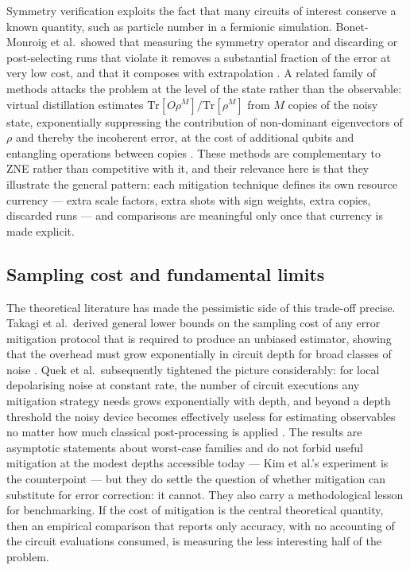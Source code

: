 \documentclass[Thesis.tex]{subfiles}
\begin{document}
Symmetry verification exploits the fact that many circuits of interest conserve
a known quantity, such as particle number in a fermionic simulation.
Bonet-Monroig et al.\ showed that measuring the symmetry operator and
discarding or post-selecting runs that violate it removes a substantial
fraction of the error at very low cost, and that it composes with
extrapolation \cite{bonetmonroig2018symmetry}. A related family of methods
attacks the problem at the level of the state rather than the observable:
virtual distillation estimates
$\mathrm{Tr}[O\rho^{M}]/\mathrm{Tr}[\rho^{M}]$ from $M$ copies of the noisy
state, exponentially suppressing the contribution of non-dominant eigenvectors
of $\rho$ and thereby the incoherent error, at the cost of additional qubits
and entangling operations between copies \cite{huggins2021virtual}. These
methods are complementary to ZNE rather than competitive with it, and their
relevance here is that they illustrate the general pattern: each mitigation
technique defines its own resource currency --- extra scale factors, extra
shots with sign weights, extra copies, discarded runs --- and comparisons are
meaningful only once that currency is made explicit.

\subsection{Sampling cost and fundamental limits}

The theoretical literature has made the pessimistic side of this trade-off
precise. Takagi et al.\ derived general lower bounds on the sampling cost of
any error mitigation protocol that is required to produce an unbiased
estimator, showing that the overhead must grow exponentially in circuit depth
for broad classes of noise \cite{takagi2022fundamental}. Quek et al.\
subsequently tightened the picture considerably: for local depolarising noise
at constant rate, the number of circuit executions any mitigation strategy
needs grows exponentially with depth, and beyond a depth threshold the noisy
device becomes effectively useless for estimating observables no matter how
much classical post-processing is applied \cite{quek2024exponentially}. The
results are asymptotic statements about worst-case families and do not forbid
useful mitigation at the modest depths accessible today --- Kim et al.'s
experiment is the counterpoint \cite{kim2023utility} --- but they do settle the
question of whether mitigation can substitute for error correction: it cannot.
They also carry a methodological lesson for benchmarking. If the cost of
mitigation is the central theoretical quantity, then an empirical comparison
that reports only accuracy, with no accounting of the circuit evaluations
consumed, is measuring the less interesting half of the problem.
\end{document}
